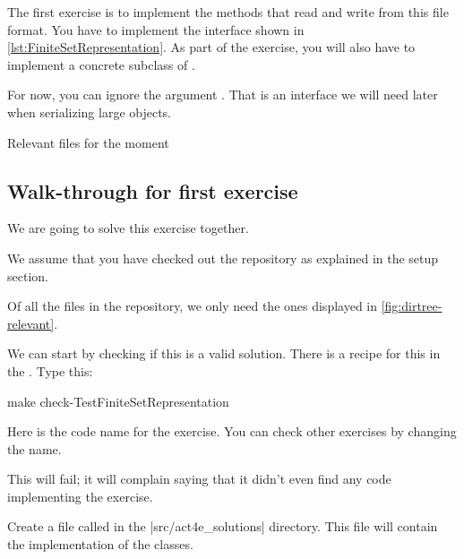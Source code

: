 \begin{codeexercise}
	\label{ex:setrepr}
	The first exercise is to implement the methods that read and write from this file format.
	You have to implement the interface \FiniteSetRepresentation shown in \cref{lst:FiniteSetRepresentation}.
	As part of the exercise, you will also have to implement a concrete subclass of \FiniteSet.
\end{codeexercise}

\begin{longcode}
	\centering
	\caption{}\label{lst:FiniteSetRepresentation}
\end{longcode}

For now, you can ignore the argument .
That is an interface we will need later when serializing large objects.

%
\begin{marginfigure}
	\caption{Relevant files for the moment}
	\label{fig:dirtree-relevant}
\end{marginfigure}

\subsection{Walk-through for first exercise}

We are going to solve this exercise together.

We assume that you have checked out the repository as explained in the setup section.

Of all the files in the repository, we only need the ones displayed in \cref{fig:dirtree-relevant}.

We can start by checking if this is a valid solution.
There is a recipe for this in the .
Type this:

\begin{console}
	make check-TestFiniteSetRepresentation
\end{console}

Here  is the code name for the exercise.
You can check other exercises by changing the name.

This will fail; it will complain saying that it didn't even find any code implementing the exercise.

Create a file called  in the \files|src/act4e_solutions| directory.
This file will contain the implementation of the classes.

